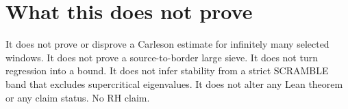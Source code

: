 \documentclass[11pt]{article}
\theoremstyle{remark}
\begin{document}
\section{What this does not prove}

It does not prove or disprove a Carleson estimate for infinitely many
selected windows.  It does not prove a source-to-border large sieve.
It does not turn regression into a bound.  It does not infer stability
from a strict SCRAMBLE band that excludes supercritical eigenvalues.
It does not alter any Lean theorem or any claim status.  No RH claim.
\end{document}
